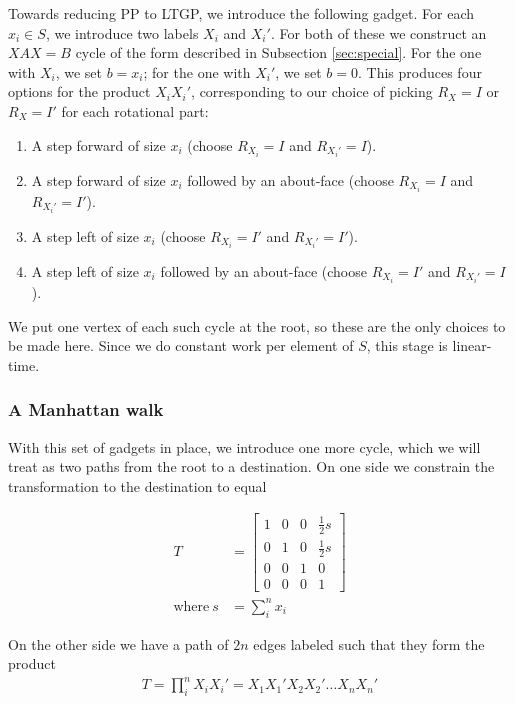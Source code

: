 Towards reducing PP to LTGP, we introduce the following gadget. For each $x_i \in S$, we introduce
two labels $X_i$ and $X_i'$. For both of these we construct an $XAX = B$ cycle of the form
described in Subsection \ref{sec:special}. For the one with $X_i$, we set $b = x_i$; for the one
with $X_i'$, we set $b = 0$. This produces four options for the product $X_i X_i'$, corresponding to 
our choice of picking $R_X = I$ or $R_X = I'$ for each rotational part:

\label{sec:steps}
\begin{enumerate}
	\item A step forward of size $x_i$ (choose $R_{X_i} = I$ and $R_{X_i'} = I$).
	\item A step forward of size $x_i$ followed by an about-face 
		(choose $R_{X_i} = I$ and $R_{X_i'} = I'$).
	\item A step left of size $x_i$ (choose $R_{X_i} = I'$ and $R_{X_i'} = I'$).
	\item A step left of size $x_i$ followed by an about-face (choose $R_{X_i} = I'$ and $R_{X_i'} = I$).
\end{enumerate}

We put one vertex of each such cycle at the root, so these are the only choices to be made here.
Since we do constant work per element of $S$, this stage is linear-time.

\subsubsection{A Manhattan walk}

With this set of gadgets in place, we introduce one more cycle, which we will treat as 
two paths from the root to a destination. On one side we constrain the transformation to the destination
to equal

\begin{align}
	T &= \left[\begin{array}{cccc}
			1 & 0 & 0 & \frac{1}{2} s \\
			0 & 1 & 0 & \frac{1}{2} s \\
			0 & 0 & 1 & 0 \\
			0 & 0 & 0 & 1
		\end{array} \right] \\
	\text{where} \ s &= \sum_i^n x_i
\end{align}

On the other side we have a path of $2n$ edges labeled such that they form the product 
\begin{align}
	T = \prod_i^n X_i X_i' = X_1 X_1' X_2 X_2' \ldots X_n X_n'
\end{align}

